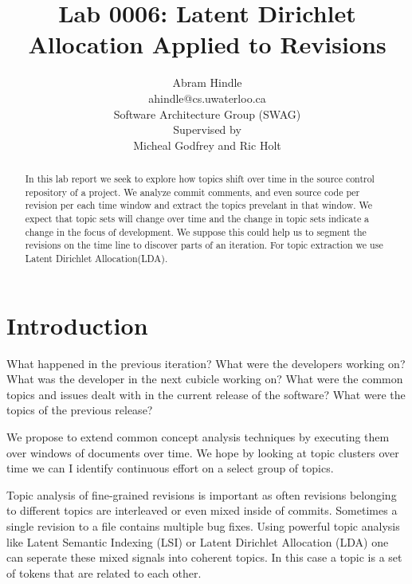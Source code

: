 \documentclass{report}
\author{Abram Hindle\\
ahindle@cs.uwaterloo.ca\\
Software Architecture Group (SWAG)\\
Supervised by\\
Micheal Godfrey and Ric Holt
}
\title{Lab 0006: Latent Dirichlet Allocation Applied to Revisions}
\newcommand{\lda}{Latent Dirichlet Allocation}
\begin{document}
\maketitle
\begin{abstract}

  In this lab report we seek to explore how topics shift over time in
  the source control repository of a project. We analyze commit
  comments, and even source code per revision per each time window and
  extract the topics prevelant in that window. We expect that topic
  sets will change over time and the change in topic sets indicate a
  change in the focus of development. We suppose this could help us to
  segment the revisions on the time line to discover parts of an
  iteration. For topic extraction we use \lda (LDA).

\end{abstract}

\section{Introduction}



% 





What happened in the previous iteration? What were the developers
working on? What was the developer in the next cubicle working on?
What were the common topics and issues dealt with in the current
release of the software? What were the topics of the previous release?

We propose to extend common concept analysis techniques by executing
them over windows of documents over time. We hope by looking at topic
clusters over time we can I identify continuous effort on a select
group of topics.

Topic analysis of fine-grained revisions is important as often
revisions belonging to different topics are interleaved or even mixed
inside of commits.  Sometimes a single revision to a file contains
multiple bug fixes.  Using powerful topic analysis like Latent
Semantic Indexing (LSI) or Latent Dirichlet Allocation (LDA) one can
seperate these mixed signals into coherent topics. In this case a
topic is a set of tokens that are related to each other.
\end{document}
